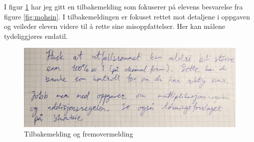 \documentclass[main.tex]{subfiles}
\begin{document}
I figur \ref{fig:mohsin2} har jeg gitt en tilbakemelding som fokuserer på
elevens besvarelse fra figure \ref{fig:mohsin}. I tilbakemeldingen er fokuset
rettet mot detaljene i oppgaven og veileder eleven videre til å rette sine
misoppfattelser. Her kan målene tydeliggjøres endatil.

\begin{figure}[h!]
\centering
\includegraphics[scale = 0.4]{../figures/mohsin2.png}
\caption{Tilbakemelding og fremovermelding}
\label{fig:mohsin2}
\end{figure}
\end{document}
